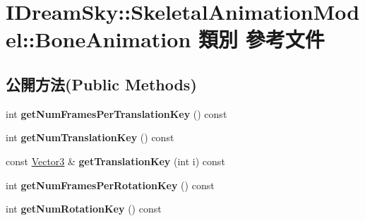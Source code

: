 \hypertarget{class_i_dream_sky_1_1_skeletal_animation_model_1_1_bone_animation}{}\section{I\+Dream\+Sky\+:\+:Skeletal\+Animation\+Model\+:\+:Bone\+Animation 類別 參考文件}
\label{class_i_dream_sky_1_1_skeletal_animation_model_1_1_bone_animation}
\subsection*{公開方法(Public Methods)}
\begin{DoxyCompactItemize}
\item 
int {\bfseries get\+Num\+Frames\+Per\+Translation\+Key} () const \hypertarget{class_i_dream_sky_1_1_skeletal_animation_model_1_1_bone_animation_af4f225a15408443e4f4ac84b15756c33}{}\label{class_i_dream_sky_1_1_skeletal_animation_model_1_1_bone_animation_af4f225a15408443e4f4ac84b15756c33}

\item 
int {\bfseries get\+Num\+Translation\+Key} () const \hypertarget{class_i_dream_sky_1_1_skeletal_animation_model_1_1_bone_animation_afd8150f33c41ab968b4d7c00fc8bd9e8}{}\label{class_i_dream_sky_1_1_skeletal_animation_model_1_1_bone_animation_afd8150f33c41ab968b4d7c00fc8bd9e8}

\item 
const \hyperlink{class_i_dream_sky_1_1_vector3}{Vector3} \& {\bfseries get\+Translation\+Key} (int i) const \hypertarget{class_i_dream_sky_1_1_skeletal_animation_model_1_1_bone_animation_ad30f1ecf64168cb9ee602c90186947f1}{}\label{class_i_dream_sky_1_1_skeletal_animation_model_1_1_bone_animation_ad30f1ecf64168cb9ee602c90186947f1}

\item 
int {\bfseries get\+Num\+Frames\+Per\+Rotation\+Key} () const \hypertarget{class_i_dream_sky_1_1_skeletal_animation_model_1_1_bone_animation_a8d55c1118c22255caf5f3a26520edbc2}{}\label{class_i_dream_sky_1_1_skeletal_animation_model_1_1_bone_animation_a8d55c1118c22255caf5f3a26520edbc2}

\item 
int {\bfseries get\+Num\+Rotation\+Key} () const \hypertarget{class_i_dream_sky_1_1_skeletal_animation_model_1_1_bone_animation_a82020adc7f4512238922e751e105e560}{}\label{class_i_dream_sky_1_1_skeletal_animation_model_1_1_bone_animation_a82020adc7f4512238922e751e105e560}


\end{DoxyCompactItemize}
